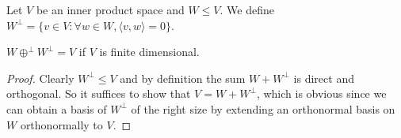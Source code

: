 \begin{definition}
    Let $V$ be an inner product space and $W\le V$.
    We define $W^\perp=\{v\in V:\forall w\in W,\langle v,w\rangle=0\}$.
\end{definition}
\begin{lemma}
    $W\oplus^\perp W^\perp=V$ if $V$ is finite dimensional.
\end{lemma}
\begin{proof}
    Clearly $W^\perp\le V$ and by definition the sum $W+W^\perp$ is direct and orthogonal.
    So it suffices to show that $V=W+W^\perp$, which is obvious since we can obtain a basis of $W^\perp$ of the right size by extending an orthonormal basis on $W$ orthonormally to $V$.
\end{proof}